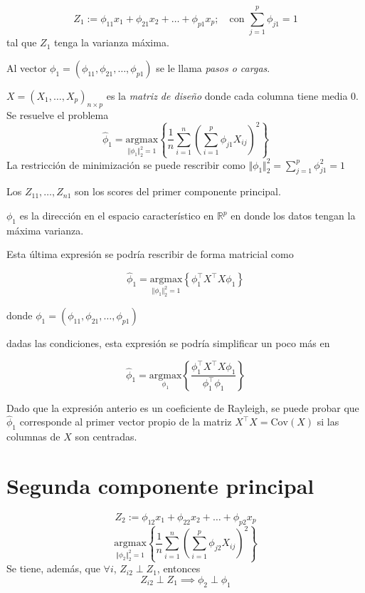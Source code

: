 \documentclass[
  12pt,
]{book}
\theoremstyle{definition}
\theoremstyle{definition}
\theoremstyle{definition}
\theoremstyle{remark}
\begin{document}
\[ Z_1 := \phi_{11}x_1 +  \phi_{21}x_2 + \dots + \phi_{p1}x_p;\quad \text{con } \sum_{j=1}^{p}\phi_{j1} = 1\]
tal que \(Z_1\) tenga la varianza máxima.

Al vector \(\phi_1 = (\phi_{11}, \phi_{21},\dots,\phi_{p1})\) se le llama \emph{pasos o cargas}.

\(X = (X_1,\dots,X_p)_{n\times p}\) es la \emph{matriz de diseño} donde cada columna tiene media 0. Se resuelve el problema
\[\hat{\phi}_1=\underset{\Vert\phi_1\Vert_2^2=1}{\mathrm{argmax}} \left\lbrace\dfrac{1}{n}\sum_{i=1}^{n}\left(\sum_{i=1}^p \phi_{j1} X_{ij} \right)^2 \right\rbrace \]
La restricción de minimización se puede rescribir como \(\Vert\phi_1\Vert_2^2= \sum_{j=1}^p \phi_{j1}^2 = 1\)

Los \(Z_{11},\dots, Z_{n1}\) son los scores del primer componente principal.

\(\phi_1\) es la dirección en el espacio característico en \(\mathbb{R}^p\) en donde los datos tengan la máxima varianza.

Esta última expresión se podría rescribir de forma matricial como

\[
\hat{\phi}_1 = \underset{\Vert\phi_1\Vert_2^2=1}{\mathrm{argmax}} \left\{ \phi_1^\top X^\top X \phi_1 \right\}
\]

donde \(\phi_1 = (\phi_{11}, \phi_{21},\dots,\phi_{p1})\)

dadas las condiciones, esta expresión se podría simplificar un poco más en

\[
\hat{\phi}_1 = \underset{\phi_1}{\mathrm{argmax}} \left\{\frac{\phi_1^\top X^\top X \phi_1 }{\phi_1^\top \phi_1}\right\}
\]

Dado que la expresión anterio es un coeficiente de Rayleigh, se puede probar que \(\hat{\phi}_{1}\) corresponde al primer vector propio de la matriz \(X^\top X = \mathrm{Cov}(X)\) si las columnas de \(X\) son centradas.

\hypertarget{segunda-componente-principal}{%
\section{Segunda componente principal}\label{segunda-componente-principal}}

\[ Z_{2}:= \phi_{12}x_1 + \phi_{22}x_2+\dots+\phi_{p2}x_p\]
\[\underset{\Vert\phi_2\Vert_2^2=1}{\mathrm{argmax}} \left\lbrace\dfrac{1}{n}\sum_{i=1}^{n}\left(\sum_{i=1}^p \phi_{j2} X_{ij} \right)^2 \right\rbrace\]
Se tiene, además, que \(\forall i\), \(Z_{i2}\perp Z_1\), entonces
\[ Z_{i2}\perp Z_1 \implies \phi_{2} \perp \phi_{1}\]
\end{document}
